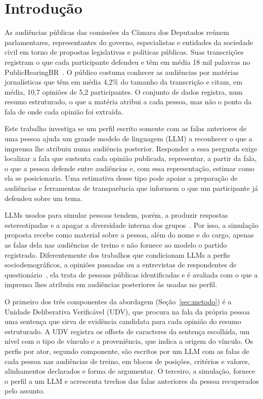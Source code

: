 \section{Introdu\c{c}\~ao}
\label{sec:introducao}

As audiências públicas das comissões da Câmara dos Deputados reúnem parlamentares, representantes
do governo, especialistas e entidades da sociedade civil em torno de propostas legislativas e
políticas públicas. Suas transcrições registram o que cada participante defendeu e têm em média 18
mil palavras no PublicHearingBR~\citep{fernandes2024publichearingbr}. O público costuma conhecer as
audiências por matérias jornalísticas que têm em média 4,2\% do tamanho da transcrição e citam, em
média, 10,7 opiniões de 5,2 participantes. O conjunto de dados registra, num resumo estruturado, o
que a matéria atribui a cada pessoa, mas não o ponto da fala de onde cada opinião foi extraída.

Este trabalho investiga se um perfil escrito somente com as falas anteriores de uma pessoa ajuda um
grande modelo de linguagem (LLM) a reconhecer o que a imprensa lhe atribuiu numa audiência
posterior. Responder a essa pergunta exige localizar a fala que sustenta cada opinião publicada,
representar, a partir da fala, o que a pessoa defende entre audiências e, com essa representação,
estimar como ela se posicionaria. Uma estimativa desse tipo pode apoiar a preparação de audiências e
ferramentas de transparência que informem o que um participante já defendeu sobre um tema.

LLMs usados para simular pessoas tendem, porém, a produzir respostas estereotipadas e a apagar a
diversidade interna dos grupos~\citep{bisbee2024synthetic,wang2025large}. Por isso, a simulação
proposta recebe como material sobre a pessoa, além do nome e do cargo, apenas as falas dela nas
audiências de treino e não fornece ao modelo o partido registrado.
Diferentemente dos trabalhos que condicionam LLMs a perfis sociodemográficos, a opiniões passadas ou
a entrevistas de respondentes de questionário~\citep{argyle2023outofone,hwang2023aligning,park2026llm},
ela trata de pessoas públicas identificadas e é avaliada com o que a imprensa lhes atribuiu em
audiências posteriores às usadas no perfil.

O primeiro dos três componentes da abordagem (Seção~\ref{sec:metodo}) é a Unidade Deliberativa
Verificável (UDV), que procura na fala da própria pessoa uma sentença que sirva de evidência
candidata para cada opinião do resumo estruturado. A UDV registra os offsets de caracteres da
sentença escolhida, um nível com o tipo de vínculo e a proveniência, que indica a origem do vínculo.
Os perfis por ator, segundo componente, são escritos por um LLM com as falas de cada pessoa nas
audiências de treino, em blocos de posições, critérios e valores, alinhamentos declarados e forma de
argumentar. O terceiro, a simulação, fornece o perfil a um LLM e acrescenta trechos das falas
anteriores da pessoa recuperados pelo assunto.

